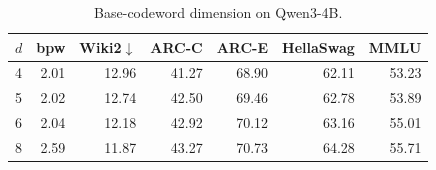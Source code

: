 \begin{table}[t]\centering\small
\caption{Base-codeword dimension on Qwen3-4B.}
\label{tab:dimension-v20}
\begin{tabular}{lrrrrrr}\toprule
$d$ & bpw & Wiki2$\downarrow$ & ARC-C & ARC-E & HellaSwag & MMLU\\\midrule
4 & 2.01 & 12.96 & 41.27 & 68.90 & 62.11 & 53.23\\
5 & 2.02 & 12.74 & 42.50 & 69.46 & 62.78 & 53.89\\
6 & 2.04 & 12.18 & 42.92 & 70.12 & 63.16 & 55.01\\
8 & 2.59 & 11.87 & 43.27 & 70.73 & 64.28 & 55.71\\\bottomrule
\end{tabular}\end{table}
